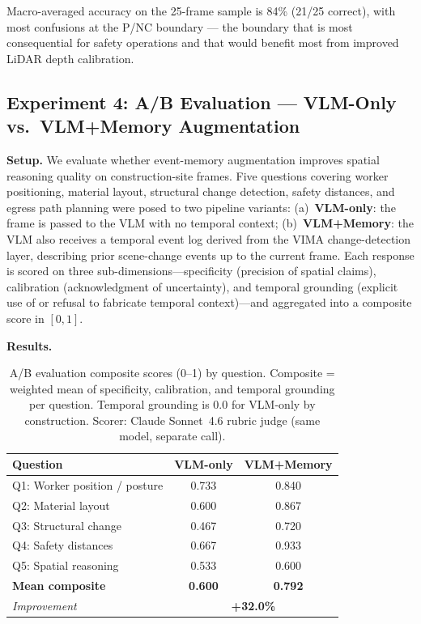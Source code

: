 \documentclass[sigconf,nonacm]{acmart}
\begin{document}
Macro-averaged accuracy on the 25-frame sample is 84\% (21/25 correct),
with most confusions at the P/NC boundary --- the boundary that is most
consequential for safety operations and that would benefit most from
improved LiDAR depth calibration.

\subsection{Experiment 4: A/B Evaluation --- VLM-Only vs.\ VLM+Memory Augmentation}
\label{sec:exp4}

\textbf{Setup.}
We evaluate whether event-memory augmentation improves spatial reasoning
quality on construction-site frames.
Five questions covering worker positioning, material layout, structural
change detection, safety distances, and egress path planning were posed
to two pipeline variants: (a)~\textbf{VLM-only}: the frame is passed to
the VLM with no temporal context; (b)~\textbf{VLM+Memory}: the VLM also
receives a temporal event log derived from the VIMA change-detection
layer, describing prior scene-change events up to the current frame.
Each response is scored on three sub-dimensions---specificity (precision
of spatial claims), calibration (acknowledgment of uncertainty), and
temporal grounding (explicit use of or refusal to fabricate temporal
context)---and aggregated into a composite score in $[0,1]$.

\textbf{Results.}

\begin{table}[h]
  \centering
  \caption{A/B evaluation composite scores (0--1) by question.
           Composite = weighted mean of specificity, calibration, and
           temporal grounding per question.
           Temporal grounding is 0.0 for VLM-only by construction.
           Scorer: Claude Sonnet~4.6 rubric judge (same model, separate call).}
  \label{tab:ab_eval}
  \small
  \begin{tabular}{@{}lcc@{}}
    \toprule
    \textbf{Question} & \textbf{VLM-only} & \textbf{VLM+Memory} \\
    \midrule
    Q1: Worker position / posture & 0.733 & 0.840 \\
    Q2: Material layout           & 0.600 & 0.867 \\
    Q3: Structural change         & 0.467 & 0.720 \\
    Q4: Safety distances          & 0.667 & 0.933 \\
    Q5: Spatial reasoning         & 0.533 & 0.600 \\
    \midrule
    \textbf{Mean composite}       & \textbf{0.600} & \textbf{0.792} \\
    \textit{Improvement}          & \multicolumn{2}{c}{\textbf{+32.0\%}} \\
    \bottomrule
  \end{tabular}
\end{table}
\end{document}
